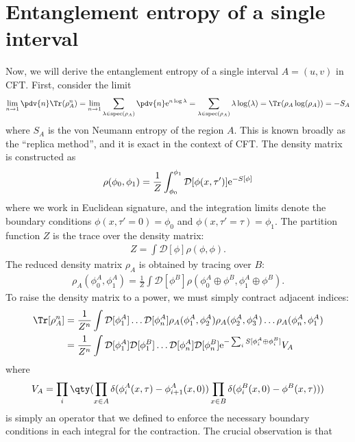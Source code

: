 \section{Entanglement entropy of a single interval}
Now, we will derive the entanglement entropy of a single interval $A = (u,v)$
in CFT. First, consider the limit
\begin{align}
\lim_{n \to 1}\pdv{n} \Tr(\rho_A^n) = \lim_{n\to 1}\sum_{\lambda \in \spec(\rho_A)}\pdv{n}\e^{n\log \lambda} = \sum_{\lambda \in \spec(\rho_A)} \lambda \log(\lambda) = \Tr(\rho_A\log(\rho_A)) = -S_A
\end{align}
where $S_A$ is the von Neumann entropy of the region $A$. This is known broadly
as the ``replica method'', and it is exact in the context of CFT. The density
matrix is constructed as
\begin{align}
\rho(\phi_0, \phi_1) = \frac{1}{Z}\int_{\phi_0}^{\phi_1}\mathcal D[\phi(x, \tau')]\mathrm e^{-S[\phi]}
\end{align}
where we work in Euclidean signature, and the integration limits denote the
boundary conditions $\phi(x,
\tau' = 0) = \phi_0$ and $\phi(x, \tau' = \tau) = \phi_1$. The partition
function $Z$ is the trace over the density matrix:
\begin{align}
  Z = \int \mathcal D[\phi] \rho(\phi, \phi).
\end{align}
The reduced density matrix $\rho_{A}$ is obtained by tracing over $B$:
\begin{align}
\rho_A(\phi^A_0, \phi^A_1) = \frac{1}{Z}\int \mathcal D[\phi^B] \rho(\phi^A_0 \oplus \phi^B, \phi^A_1 \oplus \phi^B).
\end{align}
To raise the density matrix to a power, we must simply contract adjacent indices:
\begin{align}
  \Tr[\rho_A^n] &= \frac{1}{Z^n} \int \mathcal D[\phi^A_1]\ldots \mathcal D[\phi^A_n] \rho_A(\phi_1^A, \phi_2^A)\rho_A(\phi_2^A, \phi_3^A)\ldots \rho_A(\phi_{n}^A, \phi_1^A) \\
   &= \frac{1}{Z^n} \int \mathcal D[\phi^A_1]\mathcal D[\phi^B_1]\ldots \mathcal D[\phi^A_n]\mathcal D[\phi^B_n]\e^{-\sum_i S[\phi_i^A \oplus \phi_i^B]}V_A \label{eq:Sn}
\end{align}
where
\begin{align}
V_A = \prod_i\qty(\prod_{x \in A}\delta(\phi_i^A(x, \tau) - \phi_{i+1}^A(x, 0))\prod_{x \in B}\delta(\phi_i^B(x, 0) - \phi^B(x, \tau)))
\end{align}
is simply an operator that we defined to enforce the necessary boundary
conditions in each integral for the contraction. The crucial observation is that

